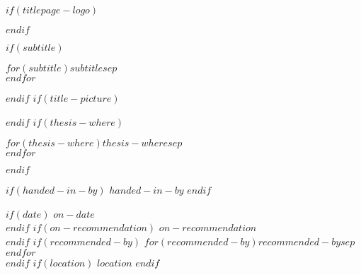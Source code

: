 \begin{titlepage}
\makeatletter
\vphantom{A}\vspace{0.5cm}
$if(titlepage-logo)$
\begin{center}

\end{center}
\vspace{2cm}
$endif$
\begin{center}
\fontsize{22pt}{24pt}\selectfont\textbf{\@title}
\end{center}
$if(subtitle)$
\begin{center}
\fontsize{16pt}{18pt}\selectfont
$for(subtitle)$$subtitle$$sep$\\ $endfor$\\
\end{center}
$endif$
$if(title-picture)$
\vspace{0.5cm}
$endif$
$if(thesis-where)$
\begin{center}
$for(thesis-where)$$thesis-where$$sep$\\ $endfor$
\end{center}
$endif$
\begin{center}
$if(handed-in-by)$
$handed-in-by$
$endif$
\end{center}
\begin{center}
\textbf{\@author}
\end{center}
\begin{center}
$if(date)$
$on-date$ \@date\\
$endif$
$if(on-recommendation)$
$on-recommendation$\\
$endif$
$if(recommended-by)$
\vspace{0.5cm}
$for(recommended-by)$$recommended-by$$sep$\\ $endfor$\\
$endif$
$if(location)$
\vfill
$location$
$endif$
\end{center}
\makeatother
\end{titlepage}
